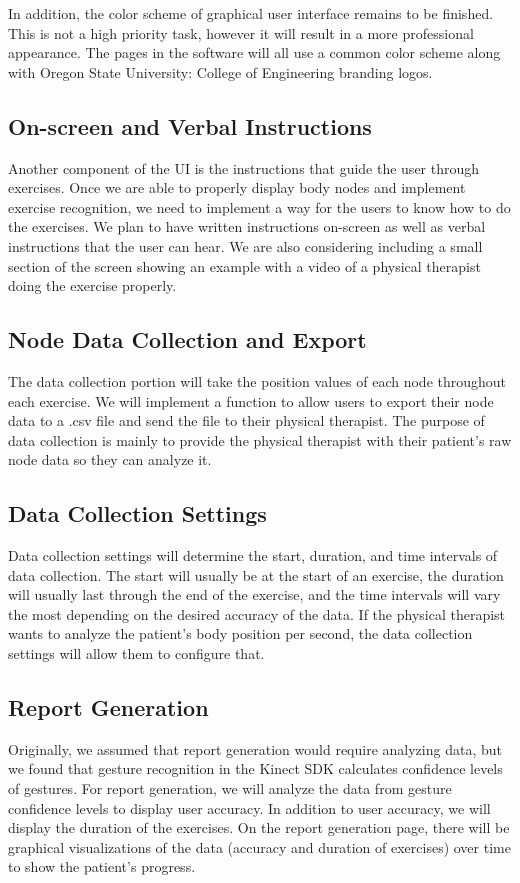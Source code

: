 \documentclass[onecolumn, draftclsnofoot,10pt, compsoc]{IEEEtran}
\begin{document}
In addition, the color scheme of graphical user interface remains to be finished. This is not a high priority task, however it will result in a more professional appearance. The pages in the software will all use a common color scheme along with Oregon State University: College of Engineering branding logos. 

\subsection{On-screen and Verbal Instructions}
Another component of the UI is the instructions that guide the user through exercises. Once we are able to properly display body nodes and implement exercise recognition, we need to implement a way for the users to know how to do the exercises. We plan to have written instructions on-screen as well as verbal instructions that the user can hear. We are also considering including a small section of the screen showing an example with a video of a physical therapist doing the exercise properly.

\subsection{Node Data Collection and Export}
The data collection portion will take the position values of each node throughout each exercise. We will implement a function to allow users to export their node data to a .csv file and send the file to their physical therapist. The purpose of data collection is mainly to provide the physical therapist with their patient's raw node data so they can analyze it.

\subsection{Data Collection Settings}
Data collection settings will determine the start, duration, and time intervals of data collection. The start will usually be at the start of an exercise, the duration will usually last through the end of the exercise, and the time intervals will vary the most depending on the desired accuracy of the data. If the physical therapist wants to analyze the patient's body position per second, the data collection settings will allow them to configure that. 

\subsection{Report Generation}
Originally, we assumed that report generation would require analyzing data, but we found that gesture recognition in the Kinect SDK calculates confidence levels of gestures. For report generation, we will analyze the data from gesture confidence levels to display user accuracy. In addition to user accuracy, we will display the duration of the exercises. On the report generation page, there will be graphical visualizations of the data (accuracy and duration of exercises) over time to show the patient's progress.
\end{document}
